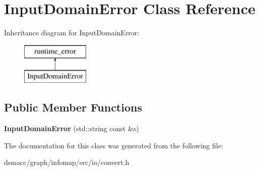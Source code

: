 \hypertarget{classInputDomainError}{}\section{Input\+Domain\+Error Class Reference}
\label{classInputDomainError}
Inheritance diagram for Input\+Domain\+Error\+:\begin{figure}[H]
\begin{center}
\leavevmode
\includegraphics[height=2.000000cm]{classInputDomainError}
\end{center}
\end{figure}
\subsection*{Public Member Functions}
\begin{DoxyCompactItemize}
\item 
\mbox{\label{classInputDomainError_a2103f111a828ee46f31a1a7b9985df20}} 
{\bfseries Input\+Domain\+Error} (std\+::string const \&s)
\end{DoxyCompactItemize}


The documentation for this class was generated from the following file\+:\begin{DoxyCompactItemize}
\item 
dsmacc/graph/infomap/src/io/convert.\+h\end{DoxyCompactItemize}

